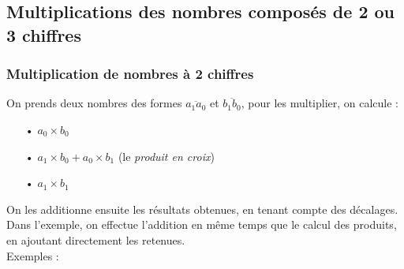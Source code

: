 \documentclass[a4paper]{article}
\begin{document}
\vfill

\pagebreak





\subsection{Multiplications des nombres composés de 2 ou 3 chiffres}

\subsubsection*{Multiplication de nombres à 2 chiffres}

{ \parindent=0.5cm On prends deux nombres des formes $\overline{a_1a_0}$ et $\overline{b_1b_0}$, pour les multiplier, on calcule :}

\begin{itemize}

	\item[•] $a_0 \times b_0$
	\item[•] $a_1 \times b_0 + a_0 \times b_1$ (le \textit{produit en croix})
	\item[•] $a_1 \times b_1$\\
	
\end{itemize}

On les additionne ensuite les résultats obtenues, en tenant compte des décalages. Dans l'exemple, on effectue l'addition en même temps que le calcul des produits, en ajoutant directement les retenues. \\

{ \parindent=0.5cm Exemples : }
\end{document}
